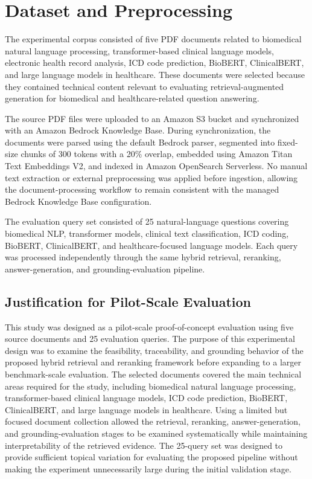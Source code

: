 \section{Dataset and Preprocessing}

The experimental corpus consisted of five PDF documents related to biomedical natural language processing, transformer-based clinical language models, electronic health record analysis, ICD code prediction, BioBERT, ClinicalBERT, and large language models in healthcare. These documents were selected because they contained technical content relevant to evaluating retrieval-augmented generation for biomedical and healthcare-related question answering.

The source PDF files were uploaded to an Amazon S3 bucket and synchronized with an Amazon Bedrock Knowledge Base. During synchronization, the documents were parsed using the default Bedrock parser, segmented into fixed-size chunks of 300 tokens with a 20$\%$ overlap, embedded using Amazon Titan Text Embeddings V2, and indexed in Amazon OpenSearch Serverless. No manual text extraction or external preprocessing was applied before ingestion, allowing the document-processing workflow to remain consistent with the managed Bedrock Knowledge Base configuration.

The evaluation query set consisted of 25 natural-language questions covering biomedical NLP, transformer models, clinical text classification, ICD coding, BioBERT, ClinicalBERT, and healthcare-focused language models. Each query was processed independently through the same hybrid retrieval, reranking, answer-generation, and grounding-evaluation pipeline.

\subsection{Justification for Pilot-Scale Evaluation}
\label{subsec:pilot_scale_justification}
This study was designed as a pilot-scale proof-of-concept evaluation using five source documents and 25 evaluation queries. The purpose of this experimental design was to examine the feasibility, traceability, and grounding behavior of the proposed hybrid retrieval and reranking framework before expanding to a larger benchmark-scale evaluation. The selected documents covered the main technical areas required for the study, including biomedical natural language processing, transformer-based clinical language models, ICD code prediction, BioBERT, ClinicalBERT, and large language models in healthcare. Using a limited but focused document collection allowed the retrieval, reranking, answer-generation, and grounding-evaluation stages to be examined systematically while maintaining interpretability of the retrieved evidence. The 25-query set was designed to provide sufficient topical variation for evaluating the proposed pipeline without making the experiment unnecessarily large during the initial validation stage.

